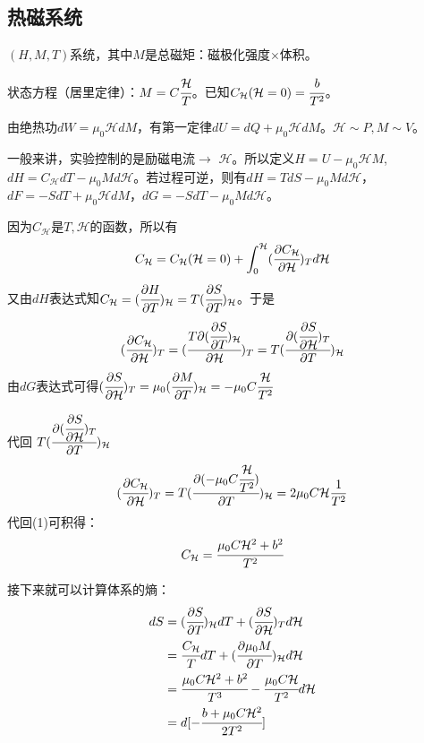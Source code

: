\documentclass[a4paper,12pt]{article}
\newcommand{\Hc}{\mathcal{H}}
\newcommand{\myp}[3]{(\cfrac{\partial{#1}}{\partial{#2}})_{#3}}
\begin{document}
\subsection{热磁系统}
$(H, M, T)$系统，其中$M$是总磁矩：磁极化强度$\times$体积。\par
状态方程（居里定律）：$M = C\cfrac{\Hc}{T}$。已知$C_{\Hc}(\Hc = 0) = \cfrac{b}{T^2}$。\par
由绝热功$dW = \mu_0 \Hc dM$，有第一定律$dU = dQ + \mu_0 \Hc dM$。$\Hc \sim P, M \sim V$。\par
一般来讲，实验控制的是励磁电流$\rightarrow$ $\Hc$。所以定义$H = U - \mu_0 \Hc M$, $dH = C_{\Hc}dT - \mu_0 M d\Hc$。若过程可逆，则有$dH = TdS - \mu_0 M d\Hc$，$dF = -SdT + \mu_0 \Hc dM$，$dG = -SdT - \mu_0 M d\Hc$。\par
因为$C_{\Hc}$是$T, \Hc$的函数，所以有
\begin{equation}
C_{\Hc} = C_{\Hc}(\Hc = 0) + \int_0^{\Hc} \myp{C_{\Hc}}{\Hc}{T} d\Hc 
\end{equation}
又由$dH$表达式知$C_{\Hc} = \myp{H}{T}{\Hc} = T\myp{S}{T}{\Hc}$。于是
\begin{equation}
\myp{C_{\Hc}}{\Hc}{T} = (\cfrac{T\partial{\myp{S}{T}{\Hc}}}{\partial{\Hc}})_{T} = T\myp{\myp{S}{\Hc}{T}}{T}{\Hc} 
\end{equation}
由$dG$表达式可得$\myp{S}{\Hc}{T} = \mu_0 \myp{M}{T}{\Hc} =  - \mu_0 C \cfrac{\Hc}{T^2}$\par
代回 $T\myp{\myp{S}{\Hc}{T}}{T}{\Hc}$
\begin{equation}
\myp{C_{\Hc}}{\Hc}{T} = T\myp{( - \mu_0 C \cfrac{\Hc}{T^2})}{T}{\Hc} = 2\mu_0 C \Hc \frac{1}{T^2} 
\end{equation}
代回(1)可积得：
\begin{equation}
C_{\Hc} = \cfrac{\mu_0 C \Hc^2 + b^2}{T^2}
\end{equation}

\newpage
接下来就可以计算体系的熵：
\begin{subequations}
\begin{align*}
dS &= \myp{S}{T}{\Hc}dT + \myp{S}{\Hc}{T} d\Hc \\
   &= \cfrac{C_{\Hc}}{T}dT + \myp{\mu_0 M}{T}{\Hc} d\Hc \\
   &= \cfrac{\mu_0 C \Hc^2 + b^2}{T^3} - \cfrac{\mu_0 C \Hc}{T^2}d\Hc \\
   &= d[- \cfrac{b + \mu_0 C \Hc^2}{2 T^2}] \\
\end{align*}
\end{subequations}
\end{document}
